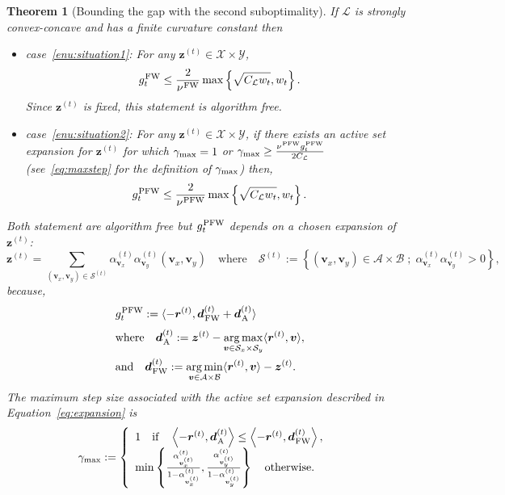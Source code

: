 \documentclass[twoside]{article}
\renewcommand{\L}{\mathcal{L}}
\newcommand{\X}{\mathcal{X}}
\newcommand{\Y}{\mathcal{Y}}
\newcommand{\M}{\X \times \Y}
\newcommand{\zt}{\bm{z}^{(t)}}
\newcommand{\vt}{\bm{v}^{(t)}}
\newcommand{\dt}{\bm{d}^{(t)}}
\newcommand{\rt}{\r^{(t)}}
\newcommand{\gap}{g_{t}}
\newcommand{\CondNumb}{\nu}
\newtheorem{theorem}[definition]{Theorem}
\DeclareMathOperator*{\argmin}{\arg\min}
\DeclareMathOperator*{\argmax}{\arg\max}
\newcommand{\stepsize}{\gamma}
\newcommand{\stepmax}{\stepsize_{\textnormal{\scriptsize max}}} %
\newcommand{\FW}{{\hspace{0.05em}\textnormal{FW}}}
\newcommand{\PW}{{\hspace{0.05em}\textnormal{PFW}}}
\newcommand{\away}{{\hspace{0.05em}\textnormal{A}}}
\newcommand{\vv}{\bm{v}} %
\newcommand{\A}{\mathcal{A}}
\newcommand{\B}{\mathcal{B}}
\newcommand{\Coreset}{\mathcal{S}}
\renewcommand{\r}{\bm{r}}
\newcommand{\innerProd}[2]{\left\langle #1 , #2 \right\rangle}
\newcommand{\innerProdCompressed}[2]{\langle #1 , #2 \rangle}
\newcommand{\0}{\mathbf{0}} %
\begin{document}
\begin{theorem}[Bounding the gap with the second suboptimality] \label{thm:subopt_gap}
  If $\L$ is strongly convex-concave and has a finite curvature constant then
  \begin{itemize}
    \item case~\eqref{enu:situation1}: For any $\zt \in \M$,
      \begin{equation}    
        \gap^{\FW} \leq \frac{2}{\CondNumb^{\FW}} \max \left\{\sqrt{C_\L w_t},w_t \right\}.
      \end{equation}
      Since $\zt$ is fixed, this statement is algorithm free.
    \item case~\eqref{enu:situation2}:  For any $\zt \in \M$, if there exists  an active set expansion for $\zt$ for which $\stepmax = 1$ or $\stepmax \geq \frac{\CondNumb^{\PW}\gap^{\PW}}{2C_\L}$ (see~\eqref{eq:maxstep} for the definition of $\stepmax$) then,
      \begin{equation}    
        \gap^{\PW} \leq \frac{2}{\CondNumb^{\PW}} \max \left\{\sqrt{C_\L w_t},w_t \right\}.
     \end{equation}
  \end{itemize}
  Both statement are algorithm free but $\gap^{\PW}$ depends on a chosen expansion of $\zt$:
   \begin{equation}\label{eq:expansion}
    \zt = \sum_{(\vv_x,\vv_y) \in \mathcal S^{(t)}} \alpha_{\vv_x}^{(t)}\alpha_{\vv_y}^{(t)} (\vv_x,\vv_y)
    \quad \text{where} \quad
     \mathcal S^{(t)} := \left\{ (\vv_x,\vv_y) \in \A\times\B\;;\; \alpha_{\vv_x}^{(t)}\alpha_{\vv_y}^{(t)} >0 \right\},
  \end{equation}
    because,
   \begin{equation}
   \begin{aligned}
   &\gap^{\PW} := \innerProdCompressed{-\rt}{\dt_\FW + \dt_\away} \\[1mm] 
    &\text{where} \quad \dt_\away := \zt - \argmax_{\vv \in \Coreset_x \times \Coreset_y} \innerProdCompressed{\rt}{\vv}, \\ 
    &\text{and} \quad \dt_\FW := \argmin_{\vv \in \A \times \B} \innerProdCompressed{\rt}{\vv} - \zt.
    \end{aligned} 
  \end{equation}
  The maximum step size associated with the active set expansion described in Equation~\eqref{eq:expansion} is 
  \begin{equation} \label{eq:maxstep}
     \gamma_{\max} := \left\{ \begin{array}
     {ll}
     1 \quad \text{if} \quad \innerProd{-\rt}{\dt_\away} \leq \innerProd{-\rt}{\dt_\FW},&\\
     \min\left\{\frac{\alpha^{(t)}_{\vt_x}}{1 -\alpha^{(t)}_{\vt_x}},\frac{\alpha^{(t)}_{\vt_y}}{1 -\alpha^{(t)}_{\vt_y}} \right\} \quad\text{otherwise}.&
     \end{array}\right.
  \end{equation}
  \end{theorem}
\end{document}

